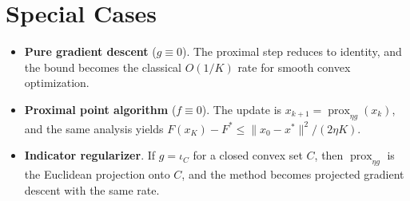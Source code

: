 \documentclass[11pt]{article}
\newcommand{\prox}{\operatorname{prox}}
\begin{document}
\section*{Special Cases}
\begin{itemize}
\item \textbf{Pure gradient descent} ($g\equiv0$). The proximal step reduces to identity, and the bound becomes the classical $O(1/K)$ rate for smooth convex optimization.
\item \textbf{Proximal point algorithm} ($f\equiv0$). The update is $x_{k+1}=\prox_{\eta g}(x_{k})$, and the same analysis yields $F(x_{K})-F^{*}\le \|x_{0}-x^{*}\|^{2}/(2\eta K)$.
\item \textbf{Indicator regularizer}. If $g=\iota_{C}$ for a closed convex set $C$, then $\prox_{\eta g}$ is the Euclidean projection onto $C$, and the method becomes projected gradient descent with the same rate.
\end{itemize}
\end{document}
